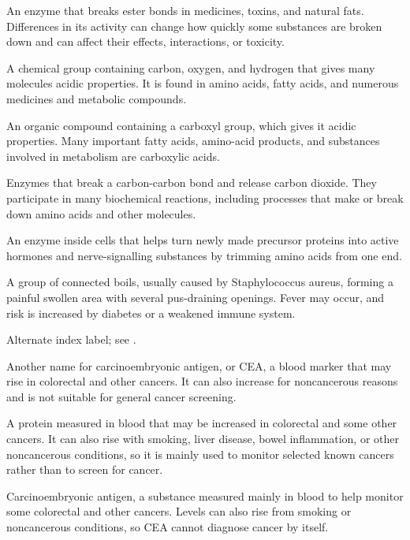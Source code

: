  An enzyme that breaks ester bonds in medicines, toxins, and natural fats. Differences in its activity can change how quickly some substances are broken down and can affect their effects, interactions, or toxicity.

 A chemical group containing carbon, oxygen, and hydrogen that gives many molecules acidic properties. It is found in amino acids, fatty acids, and numerous medicines and metabolic compounds.

 An organic compound containing a carboxyl group, which gives it acidic properties. Many important fatty acids, amino-acid products, and substances involved in metabolism are carboxylic acids.

 Enzymes that break a carbon-carbon bond and release carbon dioxide. They participate in many biochemical reactions, including processes that make or break down amino acids and other molecules.

 An enzyme inside cells that helps turn newly made precursor proteins into active hormones and nerve-signalling substances by trimming amino acids from one end.

 A group of connected boils, usually caused by Staphylococcus aureus, forming a painful swollen area with several pus-draining openings. Fever may occur, and risk is increased by diabetes or a weakened immune system.

 Alternate index label; see .

 Another name for carcinoembryonic antigen, or CEA, a blood marker that may rise in colorectal and other cancers. It can also increase for noncancerous reasons and is not suitable for general cancer screening.

 A protein measured in blood that may be increased in colorectal and some other cancers. It can also rise with smoking, liver disease, bowel inflammation, or other noncancerous conditions, so it is mainly used to monitor selected known cancers rather than to screen for cancer.

 Carcinoembryonic antigen, a substance measured mainly in blood to help monitor some colorectal and other cancers. Levels can also rise from smoking or noncancerous conditions, so CEA cannot diagnose cancer by itself.

